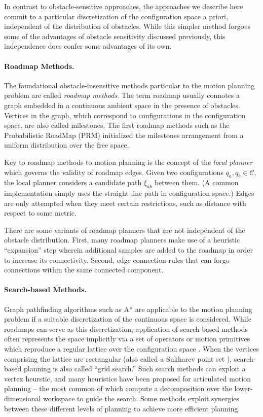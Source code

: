 In contrast to obstacle-sensitive approaches,
the approaches we describe here
commit to a particular discretization
of the configuration space a priori,
independent of the distribution of obstacles.
While this simpler method forgoes some of the advantages of
obstacle sensitivity discussed previously,
this independence does confer some advantages of its own.

\paragraph{Roadmap Methods.}

The foundational obstacle-insensitive methods particular to the motion
planning problem are called \emph{roadmap methods}.
The term roadmap usually connotes a graph embedded in a continuous
ambient space in the presence of obstacles.
Vertices in the graph,
which correspond to configurations in the configuration space,
are also called milestones.
The first roadmap methods such as the
Probabilistic RoadMap (PRM) \citep{kavrakietal1996prm}
initialized the milestones arrangement
from a uniform distribution over the free space.

Key to roadmap methods to motion planning
is the concept of the \emph{local planner}
which governs the validity of roadmap edges.
Given two configurations $q_a, q_b \in \mathcal{C}$,
the local planner considers a candidate path $\xi_{ab}$ between
them.
(A common implementation simply uses the straight-line path
in configuration space.)
Edges are only attempted when they meet certain restrictions,
such as distance with respect to some metric.

There are some variants of roadmap planners that are not independent
of the obstacle distribution.
First,
many roadmap planners make use of a heuristic ``expansion'' step
wherein additional samples are added to the roadmap
in order to increase its connectivity.
Second,
edge connection rules that can forgo connections within
the same connected component.


\paragraph{Search-based Methods.}
Graph pathfinding algorithms such as A* \citep{hart1968astar}
are applicable to the motion planning problem if a suitable
discretization of the continuous space is considered.
While roadmaps can serve as this discretization,
application of search-based methods often represents the space
implicitly via a set of operators or motion primitives
which reproduce a regular lattice over the configuration space
\citep{pivtoraiko2005statelattice}.
When the vertices comprising the lattice are rectangular
(also called a Sukharev point set \citep{sukharev1971extremum}),
search-based planning is also called ``grid search.''
Such search methods can exploit a vertex heurstic,
and many heuristics have been proposed for articulated motion planning
-- the most common of which compute a decomposition over the
lower-dimensional workspace to guide the search.
Some methods \citep{plaku2010syclop} exploit synergies between these
different levels of planning to achieve more efficient planning.

